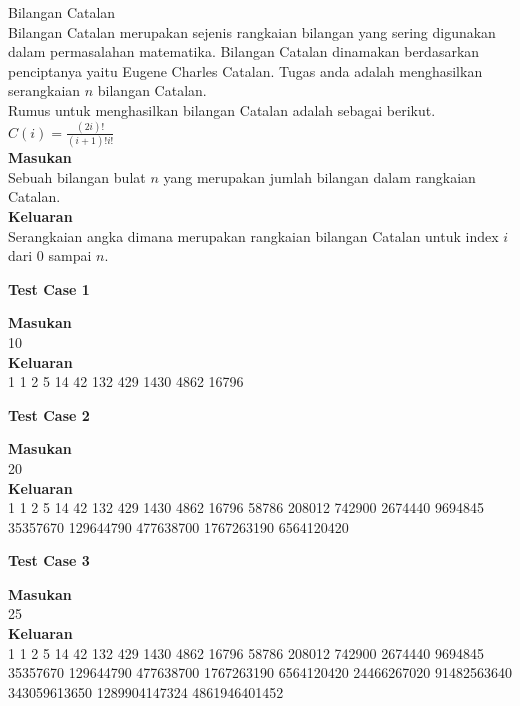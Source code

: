 \newpage

\begin{permasalahan}{Bilangan Catalan}\\
	 Bilangan Catalan merupakan sejenis rangkaian bilangan yang sering digunakan dalam permasalahan matematika. Bilangan Catalan dinamakan berdasarkan penciptanya yaitu Eugene Charles Catalan. Tugas anda adalah menghasilkan serangkaian $n$ bilangan Catalan.\\
	 Rumus untuk menghasilkan bilangan Catalan adalah sebagai berikut.\\
	 \begin{math}
	C(i) = \frac{(2i)!}{(i+1)!i!}	
	\end{math}
	\\
	\textbf{Masukan}\\
	Sebuah bilangan  bulat $n$ yang merupakan jumlah bilangan dalam rangkaian Catalan.\\
	\textbf{Keluaran}\\
	Serangkaian angka dimana merupakan rangkaian bilangan Catalan untuk index $i$ dari 0 sampai $n$.\\
	\begin{center}
	\textbf{Test Case 1}\\
	\end{center}
	\textbf{Masukan}\\
	10\\
	\textbf{Keluaran}\\
	1 1 2 5 14 42 132 429 1430 4862 16796\\
	\begin{center}
	\textbf{Test Case 2}\\
	\end{center}
	\textbf{Masukan}\\
	20\\
	\textbf{Keluaran}\\
	1 1 2 5 14 42 132 429 1430 4862 16796 58786 208012 742900 2674440 9694845 35357670 129644790 477638700 1767263190 6564120420\\
	\begin{center}
	\textbf{Test Case 3}\\
	\end{center}
	\textbf{Masukan}\\
	25\\
	\textbf{Keluaran}\\
	1 1 2 5 14 42 132 429 1430 4862 16796 58786 208012 742900 2674440 9694845 35357670 129644790 477638700 1767263190 6564120420 24466267020 91482563640 343059613650 1289904147324 4861946401452\\
\end{permasalahan}

